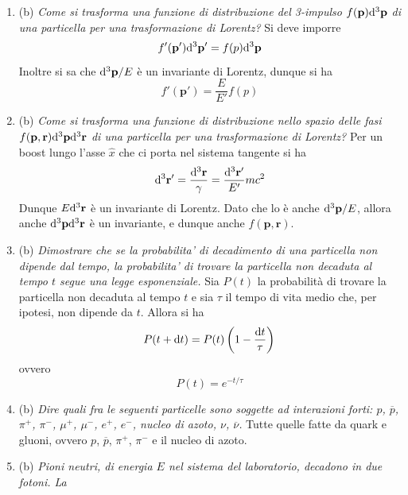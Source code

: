 \documentclass{article}
\renewcommand{\b}{(b)}
\renewcommand{\t}[1]{\textit{ #1}}
\renewcommand{\vec}[1]{\mathbf{#1}}
\begin{document}
\begin{enumerate}
{	quadrato della massa invariante di due di esse e l'energia della terza (nel centro di
	massa) sussite una relazone lineare.} Ricordando che nel sistema del centro di massa l'energia totale è $\sqrt{s}$ e l'impulso totale è nullo, e indicando con $P$ il 4-impulso totale e con $P_i$ il 4-impulso della particella $i$-esima, si ha
\begin{align*}
	s_{12}=&(P_1+P_2)^2=\\=&(P-P_3)^2=\\&=P^2+P_3^2-2PP_3=\\&=s+m_3^2-2E_3\sqrt{s}
\end{align*}
dove $E_3$ è l'energia della terza particella nel sistema del centro di massa.
\item\b\t{Come si trasforma una funzione di distribuzione del 3-impulso $f(\vec{p})\d^3\vec{p}$ di una
	particella per una trasformazione di Lorentz?}
	Si deve imporre
	\[f'(\vec{p}')\d ^3\vec{p}'=f(p)\d ^3\vec{p}\]
	Inoltre si sa che $\d ^3\vec{p}/E$ è un invariante di Lorentz, dunque si ha
	\[f'(\vec{p'})=\frac{E}{E'}f(p)\]
\item\b\t{Come si trasforma una funzione di distribuzione nello spazio delle fasi $f(\vec{p},\vec{r})\d^3\vec{p}\d ^3\vec{r}$ di una particella per una trasformazione di Lorentz?}
Per un boost lungo l'asse $\hat{x}$ che ci porta nel sistema tangente si ha
\[\d ^3\vec{r}'=\frac{\d ^3\vec{r}}{\gamma}=\frac{\d ^3\vec{r}'}{E'}mc^2\]
Dunque $E\d ^3\vec{r}$ è un invariante di Lorentz. Dato che lo è anche $\d ^3\vec{p}/E$, allora anche $\d ^3\vec{p}\d ^3\vec{r}$ è un invariante, e dunque anche $f(\vec{p},\vec{r})$.
\item\b\t{Dimostrare che se la probabilita’ di decadimento di una particella non dipende dal
	tempo, la probabilita’ di trovare la particella non decaduta al tempo $t$ segue una
	legge esponenziale.}
	Sia $P(t)$ la probabilità di trovare la particella non decaduta al tempo $t$ e sia $\tau$ il tempo di vita medio che, per ipotesi, non dipende da $t$. Allora si ha
	\[P(t+\mathrm{d} t)=P(t)\left(1-\frac{\mathrm{d} t}{\tau}\right)\]
	ovvero
	\[P(t)=e^{-t/\tau}\]
\item\b\t{Dire quali fra le seguenti particelle sono soggette ad interazioni forti: $p$, $\overline{p}$, $\pi^+$, $\pi^-$, $\mu^+$, $\mu^-$, $e^+$, $e^-$, nucleo di azoto, $\nu$, $\overline{\nu}$.} Tutte quelle fatte da quark e gluoni, ovvero $p$, $\overline{p}$, $\pi^+$, $\pi^-$ e il nucleo di azoto.
\item\b\t{Pioni neutri, di energia $E$ nel sistema del laboratorio, decadono in due fotoni. La
}
\end{enumerate}
\end{document}

